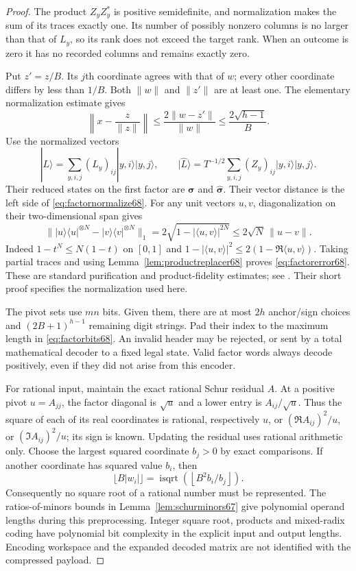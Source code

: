 \begin{proof}
The product $Z_yZ_y^*$ is positive semidefinite, and normalization
makes the sum of its traces exactly one. Its number of possibly nonzero
columns is no larger than that of $L_y$, so its rank does not exceed
the target rank. When an outcome is zero it has no recorded columns
and remains exactly zero.

Put $z'=z/B$. Its $j$th coordinate agrees with that of $w$; every
other coordinate differs by less than $1/B$. Both $\|w\|$ and
$\|z'\|$ are at least one. The elementary normalization estimate gives
\begin{equation}\label{eq:factornormalize68}
 \left\|x-\frac z{\|z\|}\right\|
 \le\frac{2\|w-z'\|}{\|w\|}
 \le\frac{2\sqrt{h-1}}B.
\end{equation}
Use the normalized vectors
\[
 |L\rangle=\sum_{y,i,j}(L_y)_{ij}|y,i\rangle|y,j\rangle,
 \qquad
 |\widehat L\rangle=T^{-1/2}\sum_{y,i,j}(Z_y)_{ij}|y,i\rangle|y,j\rangle.
\]
Their reduced states on the first factor are
$\boldsymbol\sigma$ and $\widehat{\boldsymbol\sigma}$. Their vector
distance is the left side of \eqref{eq:factornormalize68}. For any
unit vectors $u,v$, diagonalization on their two-dimensional span gives
\[
 \||u\rangle\langle u|^{\otimes N}
       -|v\rangle\langle v|^{\otimes N}\|_1
   =2\sqrt{1-|\langle u,v\rangle|^{2N}}
   \le2\sqrt N\,\|u-v\|.
\]
Indeed $1-t^N\le N(1-t)$ on $[0,1]$ and
$1-|\langle u,v\rangle|^2\le2(1-\Re\langle u,v\rangle)$.
Taking partial traces and using Lemma~\ref{lem:productreplacer68}
proves \eqref{eq:factorerror68}. These are standard purification and
product-fidelity estimates; see \cite[Section~3.2]{Watrous65}. Their
short proof specifies the normalization used here.

The pivot sets use $mn$ bits. Given them, there are at most $2h$
anchor/sign choices and $(2B+1)^{h-1}$ remaining digit strings.
Pad their index to the maximum length in \eqref{eq:factorbits68}.
An invalid header may be rejected, or sent by a total mathematical
decoder to a fixed legal state. Valid factor words always decode
positively, even if they did not arise from this encoder.

For rational input, maintain the exact rational Schur residual $A$.
At a positive pivot $u=A_{jj}$, the factor diagonal is $\sqrt u$
and a lower entry is $A_{ij}/\sqrt u$. Thus the square of each of
its real coordinates is rational, respectively $u$, or
$(\Re A_{ij})^2/u$, or $(\Im A_{ij})^2/u$; its sign is known.
Updating the residual uses rational arithmetic only. Choose the
largest squared coordinate $b_j>0$ by exact comparisons. If another
coordinate has squared value $b_i$, then
\[
 \lfloor B|w_i|\rfloor
   =\operatorname{isqrt}\!\left(\left\lfloor B^2b_i/b_j\right\rfloor\right).
\]
Consequently no square root of a rational number must be represented.
The ratios-of-minors bounds in Lemma~\ref{lem:schurminors67} give
polynomial operand lengths during this preprocessing. Integer square
root, products and mixed-radix coding have polynomial bit complexity
in the explicit input and output lengths. Encoding workspace and the
expanded decoded matrix are not identified with the compressed payload.
\end{proof}

